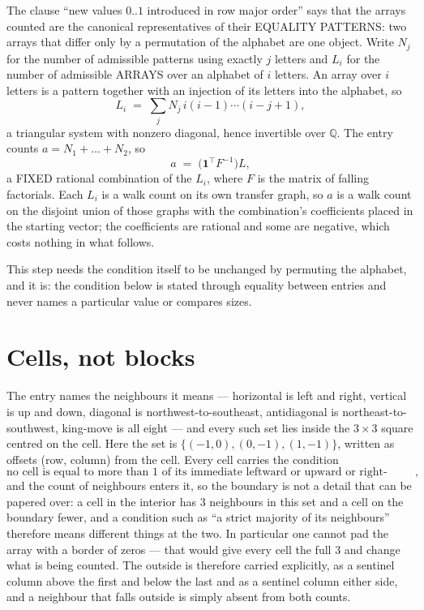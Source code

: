 \documentclass[11pt,a4paper]{article}
\theoremstyle{plain}
\theoremstyle{definition}
\begin{document}
The clause ``new values $0..1$ introduced in row major order'' says that the arrays
counted are the canonical representatives of their EQUALITY PATTERNS: two arrays that differ
only by a permutation of the alphabet are one object. Write $N_j$ for the number of admissible
patterns using exactly $j$ letters and $L_i$ for the number of admissible ARRAYS over an
alphabet of $i$ letters. An array over $i$ letters is a pattern together with an injection of
its letters into the alphabet, so
\[
L_i\;=\;\sum_{j}N_j\,i(i-1)\cdots(i-j+1),
\]
a triangular system with nonzero diagonal, hence invertible over $\mathbb{Q}$. The entry
counts $a=N_1+\dots+N_{2}$, so
\[
a\;=\;\bigl(\mathbf{1}^{\!\top}F^{-1}\bigr)L ,
\]
a FIXED rational combination of the $L_i$, where $F$ is the matrix of falling factorials.
Each $L_i$ is a walk count on its own transfer graph, so $a$ is a walk count on the disjoint
union of those graphs with the combination's coefficients placed in the starting vector; the
coefficients are rational and some are negative, which costs nothing in what follows.

This step needs the condition itself to be unchanged by permuting the alphabet, and it is:
the condition below is stated through equality between entries and never names a particular
value or compares sizes.

\section{Cells, not blocks}

The entry names the neighbours it means --- horizontal is left and right, vertical is up and
down, diagonal is northwest-to-southeast, antidiagonal is northeast-to-southwest, king-move is
all eight --- and every such set lies inside the $3\times3$ square centred on the cell. Here
the set is $\{(-1,0), (0,-1), (1,-1)\}$, written as offsets (row, column) from the cell. Every cell carries
the condition
\[
\text{no cell is equal to more than 1 of its immediate leftward or upward or right-upward antidiagonal neighbours},
\]
and the count of neighbours enters it, so the boundary is not a detail that can be papered
over: a cell in the interior has $3$ neighbours in this set and a cell on the boundary
fewer, and a condition such as ``a strict majority of its neighbours'' therefore means
different things at the two. In particular one cannot pad the array with a border of zeros ---
that would give every cell the full $3$ and change what is being counted. The outside is
therefore carried
explicitly, as a sentinel column above the first and below the last and as a sentinel column
either side, and a neighbour that falls outside is simply absent from both counts.
\end{document}

